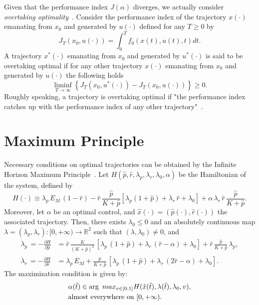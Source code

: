 \documentclass[a4paper,12pt]{article}
\newcommand{\tr}[1]{{#1}}
\begin{document}
\tr{Given that the performance index $J(\alpha)$ diverges, we actually consider \textit{overtaking optimality}~\cite{carlson_infinite_1991}.
Consider the performance index of the trajectory $x(\cdot)$ emanating from $x_0$ and generated by $u(\cdot)$ defined for any $T\geq 0$ by
$$
J_T(x_0,u(\cdot))=\int_0^T f_0(x(t),u(t),t)dt.
$$
A trajectory $x^*(\cdot)$ emanating from $x_0$ and generated by $u^*(\cdot)$ is said to be overtaking optimal if for any other trajectory $x(\cdot)$ emanating from $x_0$ and generated by $u(\cdot)$ the following holds
$$
\liminf_{T\rightarrow\infty} \left\lbrace J_T(x_0,u^*(\cdot)) - J_T(x_0,u(\cdot))\right\rbrace\geq 0.
$$
Roughly speaking, a trajectory is overtaking optimal if "the performance index catches up with the performance index of any other trajectory"~\cite{carlson_infinite_1991}.}

\section{Maximum Principle}
Necessary conditions on optimal trajectories can be obtained by the Infinite Horizon Maximum Principle~\cite{carlson_infinite_1991}.
Let $H(\hat{p},\hat{r},\lambda_p,\lambda_r,\lambda_0,\alpha)$ be the Hamiltonian of the system, defined by
\[
H(\cdot) \equiv \lambda_p\, E_M\, (1-\hat{r}) - \hat{r}\, \dfrac{\hat{p}}{K+\hat{p}}\left[\lambda_p (1+\hat{p}) +\lambda_r\, \hat{r} +\lambda_0\right] + \alpha \, \lambda_r \, \hat{r}\, \frac{\hat{p}}{K+\hat{p}}.
\]
Moreover, let $\alpha$ be an optimal control, and $\hat{x}(\cdot)=(\hat{p}(\cdot),\hat{r}(\cdot))$ the associated trajectory.
Then, there exists $\lambda_0 \leq 0$ and an absolutely continuous map $\lambda=(\lambda_p,\lambda_r):[0,+\infty) \rightarrow \mathbb{R}^2$
such that $(\lambda,\lambda_0)\neq0$, and
\begin{align}
\dot{\lambda}_p\, \tr{=-\frac{\partial H}{\partial \hat p}}&= \hat{r} \, \frac{K}{(K+\hat{p})^2}\, \left[\lambda_p \, (1+\hat{p}) +\lambda_r\, ( \hat{r}-\alpha) + \lambda_0\right] + \hat{r}\, \frac{\hat{p}}{K+\hat{p}}\, \lambda_p, \label{eq:adjoint_p}\\
 \dot{\lambda}_r\, \tr{=-\frac{\partial H}{\partial \hat r}}&= \lambda_p\, E_M +\frac{\hat{p}}{K+\hat{p}} \, \left[\lambda_p \, (1+\hat{p}) +\lambda_r\, (2 \hat{r}-\alpha) +\lambda_0\right] \label{eq:adjoint_r}.
\end{align}
The maximization condition is given by:
\begin{equation}{\label{eq:PMP}}
\begin{aligned}
&\alpha(\hat{t}) \in \arg\ max_{v \in [0,1]} H(\hat{x}(\hat{t}),\lambda(\hat{t}),\lambda_0,v), \\ &\mathrm{almost}\ \mathrm{everywhere}\ \mathrm{on}\ [0,+\infty).
\end{aligned}
\end{equation}
\end{document}
